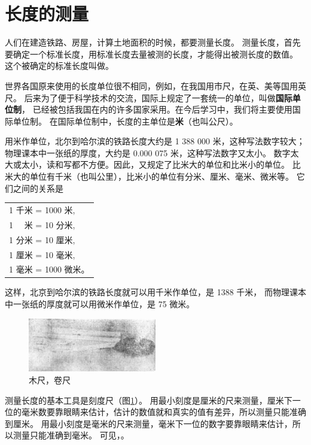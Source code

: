 \section{长度的测量}\label{sec:1-1}

人们在建造铁路、房屋，计算土地面积的时候，都要测量长度。
测量长度，首先要确定一个标准长度，用标准长度去量被测的长度，才能得出被测长度的数值。
这个被确定的标准长度叫做。

世界各国原来使用的长度单位很不相同，例如，在我国用市尺，在英、美等国用英尺。
后来为了便于科学技术的交流，国际上规定了一套统一的单位，叫做\textbf{国际单位制}，
已经被包括我国在内的许多国家采用。在今后学习中，我们将主要使用国际单位制。
在国际单位制中，长度的主单位是\textbf{米}（也叫公尺）。

用米作单位，北尔到哈尔滨的铁路长度大约是 1 388 000 米，这种写法数字较大；
物理课本中一张纸的厚度，大约是 0.000 075 米，这种写法数字又太小。
数字太大或太小，读和写都不方便。因此，又规定了比米大的单位和比米小的单位。
比米大的单位有千米（也叫公里），比米小的单位有分米、厘米、毫米、微米等。
它们之间的关系是
\vspace{-1em}\begin{center}
    \begin{tabular}{l}
        1 千米 = 1000 米, \\
        1 　米 = 10 分米, \\
        1 分米 = 10 厘米, \\
        1 厘米 = 10 毫米, \\
        1 毫米 = 1000 微米。 \\
    \end{tabular}
\end{center}\vspace{-1em}
这样，北京到哈尔滨的铁路长度就可以用千米作单位，是 1388 千米，
而物理课本中一张纸的厚度就可以用微米作单位，是 75 微米。

\begin{figure}[htbp]
    \centering
    \includegraphics[width=0.5\textwidth]{../pic/czwl1-ch1-1}
    \caption{木尺，卷尺}\label{fig:1-1}
\end{figure}

测量长度的基本工具是刻度尺（图\ref{fig:1-1}）。
用最小刻度是厘米的尺来测量，厘米下一位的毫米数要靠眼睛来估计，估计的数值就和真实的值有差异，所以测量只能准确到厘米。
用最小刻度是毫米的尺来测量，毫米下一位的数字要靠眼睛来估计，所以测量只能准确到毫米。
可见，。

